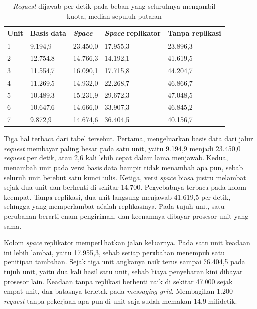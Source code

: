 \begin{table}[htbp]
  \centering
  \caption{\textit{Request} dijawab per detik pada beban yang seluruhnya
    mengambil kuota, median sepuluh putaran}
  \label{tab:hasil-tulis}
  \begin{tabularx}{\textwidth}{|l|X|X|X|X|}
    \hline
    \textbf{Unit} & \textbf{Basis data} & \textbf{\textit{Space}} & \textbf{\textit{Space} replikator} & \textbf{Tanpa replikasi} \\
    \hline
    1 & 9.194,9 & 23.450,0 & 17.955,3 & 23.896,3 \\
    \hline
    2 & 12.754,8 & 14.766,3 & 14.192,1 & 41.619,5 \\
    \hline
    3 & 11.554,7 & 16.090,1 & 17.715,8 & 44.204,7 \\
    \hline
    4 & 11.269,5 & 14.932,0 & 22.268,7 & 46.866,7 \\
    \hline
    5 & 10.489,3 & 15.231,9 & 29.672,3 & 47.048,5 \\
    \hline
    6 & 10.647,6 & 14.666,0 & 33.907,3 & 46.845,2 \\
    \hline
    7 & 9.872,9 & 14.674,6 & 36.404,5 & 40.156,7 \\
    \hline
  \end{tabularx}
\end{table}

Tiga hal terbaca dari tabel tersebut. Pertama, mengeluarkan basis data dari
jalur \textit{request} membayar paling besar pada satu unit, yaitu 9.194,9
menjadi 23.450,0 \textit{request} per detik, atau 2,6 kali lebih cepat dalam
lama menjawab. Kedua, menambah unit pada versi basis data hampir tidak menambah
apa pun, sebab seluruh unit berebut satu kunci tulis. Ketiga, versi
\textit{space} biasa justru melambat sejak dua unit dan berhenti di sekitar
14.700. Penyebabnya terbaca pada kolom keempat. Tanpa replikasi, dua unit
langsung menjawab 41.619,5 per detik, sehingga yang memperlambat adalah
replikasinya. Pada tujuh unit, satu perubahan berarti enam pengiriman, dan
keenamnya dibayar prosesor unit yang sama.

Kolom \textit{space} replikator memperlihatkan jalan keluarnya. Pada satu unit
keadaan ini lebih lambat, yaitu 17.955,3, sebab setiap perubahan menempuh satu
penitipan tambahan. Sejak tiga unit angkanya naik terus sampai 36.404,5 pada
tujuh unit, yaitu dua kali hasil satu unit, sebab biaya penyebaran kini dibayar
prosesor lain. Keadaan tanpa replikasi berhenti naik di sekitar 47.000 sejak
empat unit, dan batasnya terletak pada \textit{messaging
grid}. Membagikan
1.200 \textit{request} tanpa pekerjaan apa pun di unit saja sudah memakan 14,9
milidetik.


